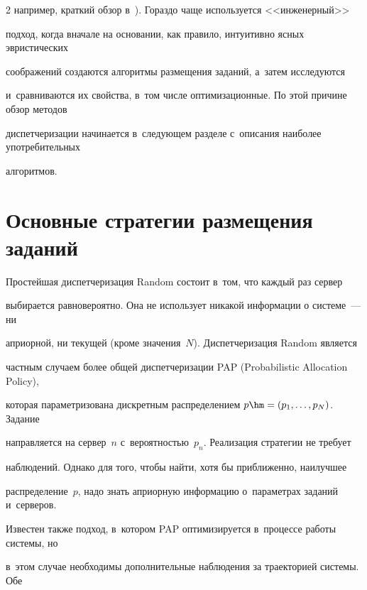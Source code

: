 \begin{multicols}{2}
например, краткий обзор в~\cite{2-kon}). Гораздо чаще используется <<инженерный>> 


подход, когда вначале на основании, как правило, интуитивно ясных эвристических 


соображений создаются алгоритмы размещения заданий, а~затем исследуются 


и~сравниваются их свойства, в~том числе оптимизационные. По этой причине обзор методов 


диспетчеризации начинается в~следующем разделе с~описания наиболее употребительных 


алгоритмов.





\vspace*{-9pt}





\section{Основные стратегии размещения заданий}





\vspace*{-2pt}





    Простейшая диспетчеризация Random состоит в~том, что каждый раз сервер 


выбирается равновероятно. Она не использует никакой информации о системе~--- ни 


априорной, ни текущей (кроме значения~$N$). Диспетчеризация Random является 


частным случаем более общей диспетчеризации PAP (Probabilistic Allocation Policy), 


которая параметризована дискретным распределением $p\hm= (p_1,\ldots, p_N)$. Задание 


направляется на сервер~$n$ с~вероятностью~$p_n$. Реализация стратегии не требует 


наблюдений. Однако для того, чтобы найти, хотя бы приближенно, наилучшее 


распределение~$p$, надо знать априорную информацию о~параметрах заданий и~серверов. 


Известен также подход, в~котором PAP оптимизируется в~процессе работы системы, но 


в~этом случае необходимы дополнительные наблюдения за траекторией системы. Обе 



\end{multicols}
